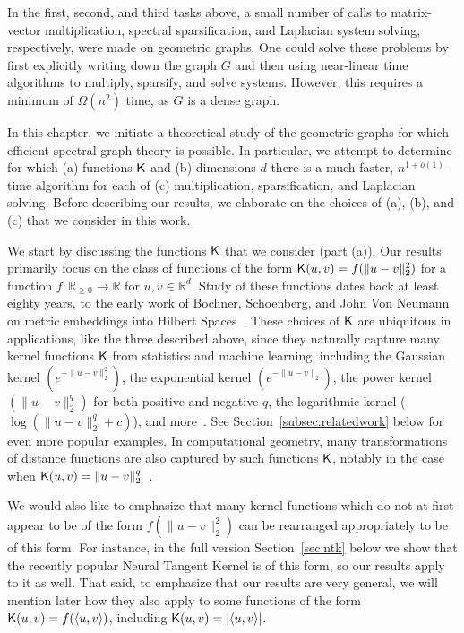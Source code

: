 In the first, second, and third tasks above, a small number of calls to matrix-vector multiplication, spectral sparsification, and Laplacian system solving, respectively, were made on geometric graphs. One could solve these problems by first explicitly writing down the graph $G$ and then using near-linear time algorithms \cite{ss11,ckmpprx14} to multiply, sparsify, and solve systems. However, this requires a minimum of $\Omega(n^2)$ time, as $G$ is a dense graph.

In this chapter, we initiate a theoretical study of the geometric graphs for which efficient spectral graph theory is possible. In particular, we attempt to determine for which (a) functions $\mathsf{K}$ and (b) dimensions $d$ there is a much faster, $n^{1+o(1)}$-time algorithm for each of (c) multiplication, sparsification, and Laplacian solving. Before describing our results, we elaborate on the choices of (a), (b), and (c) that we consider in this work.

We start by discussing the functions $\mathsf{K}$ that we consider (part (a)). Our results primarily focus on the class of functions of the form $\mathsf{K}(u,v) = f(\|u-v\|_2^2)$ for a function $f:\mathbb{R}_{\ge 0}\rightarrow \mathbb{R}$ for $u,v\in \mathbb{R}^d$. Study of these functions dates back at least eighty years, to the early work of Bochner, Schoenberg, and John Von Neumann on metric embeddings into Hilbert Spaces~\cite{b33, s37, ns41}. These choices of $\mathsf{K}$ are ubiquitous in applications, like the three described above, since they naturally capture many kernel functions $\mathsf{K}$ from statistics and machine learning, including the Gaussian kernel $(e^{-\|u-v\|_2^2})$, the exponential kernel $(e^{-\|u-v\|_2})$, the power kernel $(\|u-v\|_2^q)$ for both positive and negative $q$, the logarithmic kernel ($\log (\|u-v\|_2^q + c)$), and more~\cite{s10, z05, btb05}.  See Section~\ref{subsec:relatedwork} below for even more popular examples. In computational geometry, many transformations of distance functions are also captured by such functions $\mathsf{K}$, notably in the case when $\mathsf{K}(u,v) = \|u-v\|_2^q$~\cite{l82, as14,acx19, cms20}. 

We would also like to emphasize that many kernel functions which do not at first appear to be of the form $f(\|u-v\|_2^2)$ can be rearranged appropriately to be of this form. For instance, in
\ifdefined\isfocs
the full version
\else
Section~\ref{sec:ntk} below 
\fi
we show that the recently popular Neural Tangent Kernel is of this form, so our results apply to it as well.
That said, to emphasize that our results are very general, we will mention later how they also apply to some functions of the form $\mathsf{K}(u,v) = f(\langle u,v\rangle )$, including $\mathsf{K}(u,v) = |\langle u,v\rangle |$.

